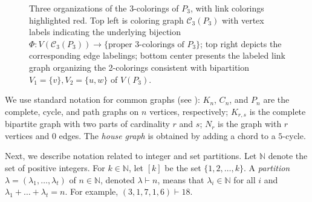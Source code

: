 \documentclass{amsart}
\theoremstyle{hypothesisstyle}
\newcommand{\set}[1]{\{#1\}}
\theoremstyle{definition}
\theoremstyle{remark}
\numberwithin{equation}{section}
\newcommand{\C}{\mathcal C}
\begin{document}
\begin{figure}[ht]
\begin{center}
\end{center}

\caption{Three organizations of the 3-colorings of $P_3$, with link colorings highlighted red. Top left is coloring graph $\mathcal C_3(P_3)$ with vertex labels indicating the underlying bijection $\Phi\colon V(\C_3(P_3))\to \set{\text{proper 3-colorings of $P_3$}}$; top right depicts the corresponding edge labelings; bottom center presents the labeled link graph organizing the 2-colorings consistent with bipartition $V_1=\set{v},V_2=\set{u,w}$ of $V(P_3)$.}\label{fig:coloring-graph-labeling}
\end{figure}

We use standard notation for common graphs (see \cite{Wes01}): $K_n$, $C_n$, and $P_n$ are the complete, cycle, and path graphs on $n$ vertices, respectively; $K_{r, s}$ is the complete bipartite graph with two parts of cardinality $r$ and $s$; $N_r$ is the graph with $r$ vertices and $0$ edges. The \emph{house graph} is obtained by adding a chord to a $5$-cycle. 

Next, we describe notation related to integer and set partitions. Let $\mathbb{N}$ denote the set of positive integers. For $k\in\mathbb{N}$, let $[k]$ be the set $\{1, 2, \dots, k\}$. A \emph{partition} $\lambda=(\lambda_1, \dots, \lambda_t)$ of $n\in\mathbb{N}$, denoted $\lambda\vdash n$, means that $\lambda_i\in\mathbb{N}$ for all $i$ and $\lambda_1+ \dots + \lambda_t = n$. For example, $(3, 1, 7, 1, 6)\vdash 18$.
\end{document}
